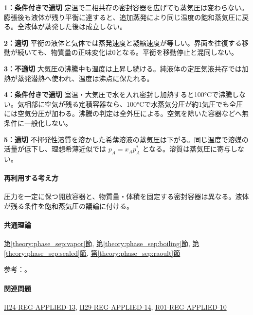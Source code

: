 \noindent\textbf{1：条件付きで適切} 定温で二相共存の密封容器を広げても蒸気圧は変わらない。膨張後も液体が残り平衡に達すると、追加蒸発により同じ温度の飽和蒸気圧に戻る。全液体が蒸発した後は成立しない。\par

\noindent\textbf{2：適切} 平衡の液体と気体では蒸発速度と凝縮速度が等しい。界面を往復する移動が続いても、物質量の正味変化は0となる。平衡を移動停止と混同しない。\par

\noindent\textbf{3：不適切} 大気圧の沸騰中も温度は上昇し続ける。純液体の定圧気液共存では加熱が蒸発潜熱へ使われ、温度は沸点に保たれる。\par

\noindent\textbf{4：条件付きで適切} 室温・大気圧で水を入れ密封し加熱すると100°Cで沸騰しない。気相部に空気が残る定積容器なら、100°Cで水蒸気分圧が約1気圧でも全圧には空気分圧が加わる。沸騰の判定は全外圧による。空気を除いた容器などへ無条件に一般化しない。\par

\noindent\textbf{5：適切} 不揮発性溶質を溶かした希薄溶液の蒸気圧は下がる。同じ温度で溶媒の活量が低下し、理想希薄近似では \(p_A=x_Ap_A^*\) となる。溶質は蒸気圧に寄与しない。\par

\paragraph{再利用する考え方} 圧力を一定に保つ開放容器と、物質量・体積を固定する密封容器は異なる。液体が残る条件を飽和蒸気圧の議論に付ける。

\paragraph{共通理論} \hyperref[theory:phase_sep:vapor]{第\ref*{theory:phase_sep:vapor}節}, \hyperref[theory:phase_sep:boiling]{第\ref*{theory:phase_sep:boiling}節}, \hyperref[theory:phase_sep:sealed]{第\ref*{theory:phase_sep:sealed}節}, \hyperref[theory:phase_sep:raoult]{第\ref*{theory:phase_sep:raoult}節}

\par 参考：\cite{mit_solutions2008,mit_clapeyron2008}。

\paragraph{関連問題} \hyperref[q:h24-reg-applied-13]{H24-REG-APPLIED-13}, \hyperref[q:h29-reg-applied-14]{H29-REG-APPLIED-14}, \hyperref[q:r01-reg-applied-10]{R01-REG-APPLIED-10}

